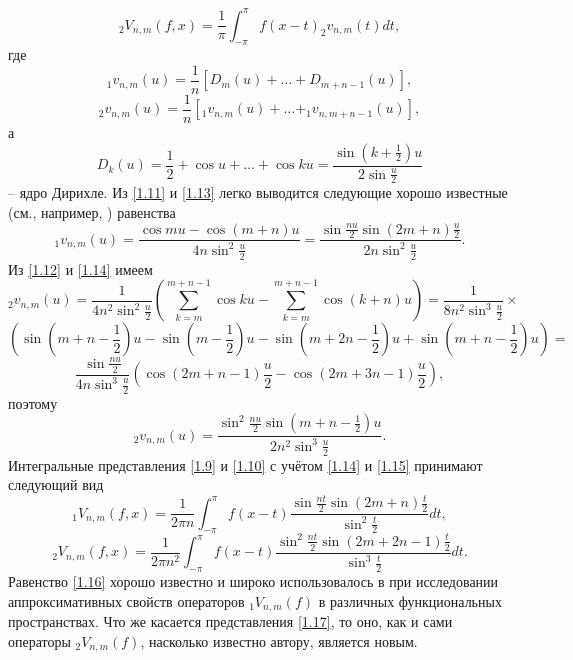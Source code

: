 \begin{equation}\label{1.10}
 _2V_{n,m}(f,x)=\frac{1}{\pi}\int_{-\pi}^\pi f(x-t)_2v_{n,m}(t)dt,
 \end{equation}
где
\begin{equation}\label{1.11}
 _1v_{n,m}(u)=\frac{1}{n}[D_m(u)+\ldots+D_{m+n-1}(u)],
 \end{equation}
\begin{equation}\label{1.12}
 _2v_{n,m}(u)=\frac{1}{n}[_1v_{n,m}(u)+\ldots+_1v_{n,m+n-1}(u)],
 \end{equation}
 а
\begin{equation}\label{1.13}
D_k(u) =\frac{1}{2}+\cos u +\ldots+\cos ku =\frac{\sin(k+\frac12)u}{2\sin\frac{u}{2}}
 \end{equation}
-- ядро Дирихле. Из \eqref{1.11} и \eqref{1.13} легко выводится следующие хорошо известные (см., например, \cite{LapVPZhuk}) равенства
\begin{equation}\label{1.14}
_1v_{n,m}(u) =\frac{\cos mu-\cos (m+n)u}{4n\sin^2\frac{u}{2}}=
\frac{\sin\frac{nu}{2}\sin(2m+n)\frac{u}{2}}{2n\sin^2\frac{u}{2}}.
 \end{equation}
Из \eqref{1.12} и \eqref{1.14} имеем
\begin{equation*}
 _2v_{n,m}(u)=\frac{1}{4n^2\sin^2\frac{u}{2}}\left(\sum_{k=m}^{m+n-1}\cos ku-
 \sum_{k=m}^{m+n-1}\cos(k+n)u\right)=\frac{1}{8n^2\sin^3\frac{u}{2}}\times
 \end{equation*}
\begin{equation*}
 \left(\sin(m+n-\frac12)u-\sin(m-\frac12)u
 -\sin(m+2n-\frac12)u+\sin(m+n-\frac12)u\right)=
 \end{equation*}
\begin{equation*}
 \frac{\sin\frac{nu}{2}}{4n\sin^3\frac{u}{2}}
 \left(\cos(2m+n-1)\frac{u}{2}-\cos(2m+3n-1)\frac{u}{2}\right),
  \end{equation*}
поэтому
\begin{equation}\label{1.15}
 _2v_{n,m}(u)=\frac{\sin^2\frac{nu}{2}\sin(m+n-\frac12)u}{2n^2\sin^3\frac{u}{2}}.
  \end{equation}
Интегральные представления \eqref{1.9} и \eqref{1.10} с учётом  \eqref{1.14} и \eqref{1.15}  принимают следующий вид
\begin{equation}\label{1.16}
 _1V_{n,m}(f,x)=\frac{1}{2\pi n}\int_{-\pi}^\pi f(x-t) \frac{\sin\frac{nt}{2}\sin(2m+n)\frac{t}{2}}{\sin^2\frac{t}{2}}dt,
 \end{equation}
\begin{equation}\label{1.17}
 _2V_{n,m}(f,x)=\frac{1}{2\pi n^2}\int_{-\pi}^\pi f(x-t) \frac{\sin^2\frac{nt}{2}\sin(2m+2n-1)\frac{t}{2}}{\sin^3\frac{t}{2}}dt.
 \end{equation}
Равенство \eqref{1.16} хорошо известно и широко использовалось в \cite{LapVPZhuk} при исследовании аппроксимативных свойств операторов $_1V_{n,m}(f)$ в различных функциональных пространствах.  Что же касается представления \eqref{1.17}, то оно, как и сами операторы  $ _2V_{n,m}(f)$, насколько известно автору, является новым.


